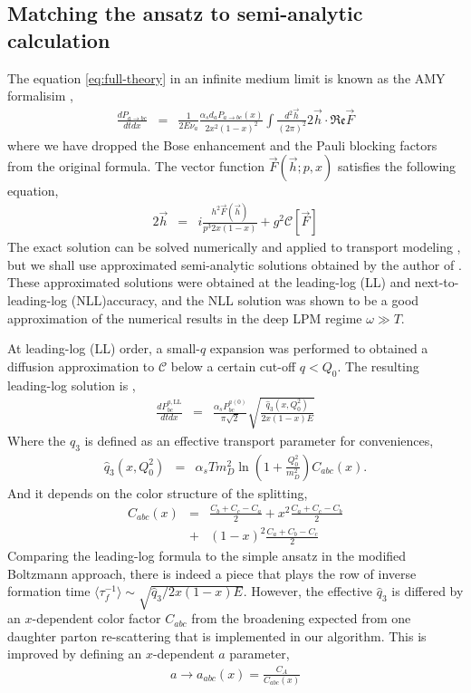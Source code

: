 \documentclass[aps, prc, reprint, amsmath, groupedaddress, nofootinbib]{revtex4-1}
\begin{document}
\subsection{Matching the ansatz to semi-analytic calculation}
The equation \ref{eq:full-theory} in an infinite medium limit is known as the AMY formalisim \cite{Arnold:2002ja,Arnold:2002zm,Arnold:2003zc},
\begin{eqnarray}\label{eq:AMY-1}
\nonumber
\frac{dP_{a\rightarrow bc}}{dt dx} &=& \frac{1}{2E\nu_a} \frac{\alpha_s d_a P_{a\rightarrow bc}(x)}{2x^2(1-x)^2}\int\frac{d^2\vec{h}}{(2\pi)^2}2\vec{h}\cdot \mathfrak{Re} \vec{F}
\end{eqnarray}
where we have dropped the Bose enhancement and the Pauli blocking factors from the original formula.
The vector function $\vec{F}(\vec{h}; p, x)$ satisfies the following equation,
\begin{eqnarray}\label{eq:AMY-2}
\nonumber
2\vec{h} &=& i\frac{h^2 \vec{F}(\vec{h})}{p^3 2x(1-x)} + g^2 \mathcal{C}[\vec{F}]
\end{eqnarray} 
The exact solution can be solved numerically and applied to transport modeling \cite{Jeon:2003gi,Schenke:2009gb}, but we shall use approximated semi-analytic solutions obtained by the author of \cite{Arnold:2008zu}.
These approximated solutions were obtained at the leading-log (LL) and next-to-leading-log (NLL)accuracy, and the NLL solution was shown to be a good approximation of the numerical results in the deep LPM regime $\omega \gg T$.

At leading-log (LL) order, a small-$q$ expansion was performed to obtained a diffusion approximation to $\mathcal{C}$ below a certain cut-off $q<Q_0$.
The resulting leading-log solution is \cite{Arnold:2008zu},
\begin{eqnarray}\label{eq:AMY-LL}
\frac{dP_{bc}^{a,\textrm{LL}}}{dt dx} &=& \frac{\alpha_s P_{bc}^{a(0)}}{\pi\sqrt{2}}
\sqrt{\frac{\hat{q}_3(x, Q_0^2)}{2x(1-x)E}}
\end{eqnarray}
Where the $\hat{q}_3$ is defined as an effective transport parameter for conveniences,
\begin{eqnarray}
\hat{q}_3(x, Q_0^2) &=& \alpha_s T m_D^2 \ln\left(1+\frac{Q_0^2}{m_D^2}\right) C_{abc}(x).\label{eq:qhat3}
\end{eqnarray}
And it depends on the color structure of the splitting,
\begin{eqnarray}
C_{abc}(x) &=&  \frac{C_b+C_c-C_a}{2} + x^2 \frac{C_a+C_c-C_b}{2} \\\nonumber
&+& (1-x)^2\frac{C_a+C_b-C_c}{2}
\end{eqnarray}
Comparing the leading-log formula to the simple ansatz in the modified Boltzmann approach, there is indeed a piece that plays the row of inverse formation time $\langle\tau_f^{-1}\rangle \sim \sqrt{\hat{q}_3 / 2x(1-x)E}$. 
However, the effective $\hat{q}_3$ is differed by an $x$-dependent color factor $C_{abc}$ from the broadening expected from one daughter parton re-scattering that is implemented in our algorithm.
This is improved by defining an $x$-dependent $a$ parameter,
\begin{eqnarray}
a \rightarrow a_{abc}(x) = \frac{C_A}{C_{abc}(x)}
\end{eqnarray}
\end{document}
